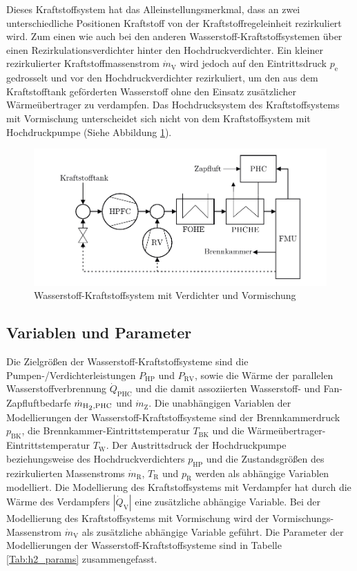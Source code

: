 Dieses Kraftstoffsystem hat das Alleinstellungsmerkmal, dass an zwei unterschiedliche Positionen Kraftstoff von der Kraftstoffregeleinheit rezirkuliert wird. Zum einen wie auch bei den anderen Wasserstoff-Kraftstoffsystemen über einen Rezirkulationsverdichter hinter den Hochdruckverdichter. Ein kleiner rezirkulierter Kraftstoffmassenstrom $\dot{m}_\mathrm{V}$ wird jedoch auf den Eintrittsdruck $p_\mathrm{e}$ gedrosselt und vor den Hochdruckverdichter rezirkuliert, um den aus dem Kraftstofftank geförderten Wasserstoff ohne den Einsatz zusätzlicher Wärmeübertrager zu verdampfen. Das Hochdrucksystem des Kraftstoffsystems mit Vormischung unterscheidet sich nicht von dem Kraftstoffsystem mit Hochdruckpumpe (Siehe Abbildung \ref{fig:vormischung}).

\begin{figure}[ht]
\centering
\includegraphics[width=1\linewidth]{4_Abbildungen/2_Hauptteil/Kraftstoffsystem Abbildungen/dual.pdf}
  \caption{Wasserstoff-Kraftstoffsystem mit Verdichter und Vormischung}
  \label{fig:vormischung}
\end{figure}
\FloatBarrier 

\subsection{Variablen und Parameter}

Die Zielgrößen der Wasserstoff-Kraftstoffsysteme sind die Pumpen-/Verdichterleistungen $P_{\mathrm{HP}}$ und $P_{\mathrm{RV}}$, sowie die Wärme der parallelen Wasserstoffverbrennung $\dot{Q}_\mathrm{PHC}$ und die damit assoziierten Wasserstoff- und Fan-Zapfluftbedarfe $\dot{m}_\mathrm{H\textsubscript{2}, PHC}$ und $\dot{m}_\mathrm{Z}$. Die unabhängigen Variablen der Modellierungen der Wasserstoff-Kraftstoffsysteme sind der Brennkammerdruck $p_{\mathrm{BK}}$, die Brennkammer-Eintrittstemperatur $T_\mathrm{BK}$ und die Wärmeübertrager-Eintrittstemperatur $T_\mathrm{W}$. Der Austrittsdruck der Hochdruckpumpe beziehungsweise des Hochdruckverdichters $p_{\mathrm{HP}}$ und die Zustandsgrößen des rezirkulierten Massenstroms $\dot{m}_\mathrm{R}$, $T_\mathrm{R}$ und $p_\mathrm{R}$ werden als abhängige Variablen modelliert. Die Modellierung des Kraftstoffsystems mit Verdampfer hat durch die Wärme des Verdampfers $|\dot{Q}_\mathrm{V}|$ eine zusätzliche abhängige Variable. Bei der Modellierung des Kraftstoffsystems mit Vormischung wird der Vormischungs-Massenstrom $\dot{m}_\mathrm{V}$ als zusätzliche abhängige Variable geführt. Die Parameter der Modellierungen der Wasserstoff-Kraftstoffsysteme sind in Tabelle \ref{Tab:h2_params} zusammengefasst.

